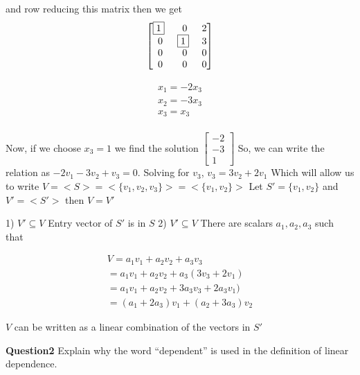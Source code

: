 \documentclass{article}
\begin{document}
and row reducing this matrix then we get
\begin{equation}
  \begin{bmatrix}
    \p & 0 & 2 \\
    0 & \p & 3 \\
    0 & 0 & 0 \\
    0 & 0 & 0 \\
  \end{bmatrix}
\end{equation}

\begin{equation}
  \begin{matrix}
    x_1=-2x_3 \\
    x_2 = -3x_3 \\
    x_3 = x_3 \\
  \end{matrix}
\end{equation}

Now, if we choose \(x_3 = 1\) we find the solution
\(
\begin{bmatrix}
  -2 \\
  -3 \\
  1
\end{bmatrix}
\)
So, we can write the relation as \(-2v_1-3v_2+v_3=0\). Solving for \(v_3\), \(v_3=3v_2+2v_1\)
Which will allow us to write \(V=<S> = <\{v_1, v_2, v_3\}> = <\{v_1, v_2\}>\)
Let \(S'=\{v_1, v_2\}\) and \(V'=<S'>\) then \(V=V'\)

1) \(V' \subseteq V\) Entry vector of \(S'\) is in \(S\)
2) \(V' \subseteq V\) There are scalars \(a_1, a_2, a_3\) such that

\begin{equation}
  \begin{matrix}
    V = a_1 v_1 + a_2 v_2 + a_3 v_3 \\
      = a_1 v_1 + a_2 v_2 + a_3 (3v_3 + 2v_1) \\
      = a_1 v_1 + a_2 v_2 + 3 a_3 v_3 + 2 a_3 v_1) \\
      = (a_1 + 2 a_3) v_1 + (a_2 + 3 a_3) v_2
  \end{matrix}
\end{equation}

\(V\) can be written as a linear combination of the vectors in \(S'\)

\bigskip
\bigskip

\noindent\textbf{Question2} Explain why the word “dependent” is used in the definition of linear dependence.
\end{document}
